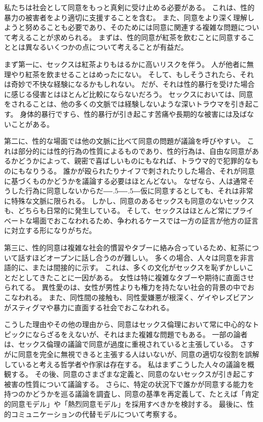 \documentclass[paper=a4,book,openany]{jlreq}
\def\DDASH{―\kern-.5\zw―\kern-.5\zw―}
\begin{document}
私たちは社会として同意をもっと真剣に受け止める必要がある。
これは、性的暴力の被害者をより適切に支援することを含む。
また、同意をより深く理解しようと努めることも必要であり、そのためには同意に関連する複雑な問題について考えることが求められる。
まずは、性的同意が紅茶を飲むことに同意することとは異なるいくつかの点について考えることが有益だ。

まず第一に、セックスは紅茶よりもはるかに高いリスクを伴う。
人が他者に無理やり紅茶を飲ませることはめったにない。
そして、もしそうされたら、それは奇妙で不快な経験になるかもしれない。
だが、それは性的暴行を受けた場合に感じる侵害とはほとんど比較にならないだろう。
セックスにおいては、同意をされることは、他の多くの文脈では経験しないような深いトラウマを引き起こす。
身体的暴行ですら、性的暴行が引き起こす苦痛や長期的な被害には及ばないことがある。

第二に、性的な場面では他の文脈に比べて同意の問題が議論を呼びやすい。
これは部分的には性的行為の性質によるものであり、性的行為は、自由な同意があるかどうかによって、親密で喜ばしいものにもなれば、トラウマ的で犯罪的なものにもなりうる。
誰かが殴られたりナイフで刺されたりした場合、それが同意に基づくものかどうかを議論する必要はほとんどない。
なぜなら、人は通常そうした行為に同意しないからだ{\DDASH}仮に同意するとしても、それは非常に特殊な文脈に限られる。
しかし、同意のあるセックスも同意のないセックスも、どちらも日常的に発生している。
そして、セックスはほとんど常にプライベートな場面でおこなわれるため、争われるケースでは一方の証言が他方の証言に対立する形になりがちだ。

第三に、性的同意は複雑な社会的慣習やタブーに絡み合っているため、紅茶について話すほどオープンに話し合うのが難しい。
多くの場合、人々は同意を非言語的に、または間接的に示す。
これは、多くの文化がセックスを恥ずかしいことだとしてきたことに一因がある。
女性は特に複雑なタブーや期待に直面させられてる。
異性愛のは、女性が男性よりも権力を持たない社会的背景の中でおこなわれる。
また、同性間の接触も、同性愛嫌悪が根深く、ゲイやレズビアンがスティグマや暴力に直面する社会でおこなわれる。

こうした理由やその他の理由から、同意はセックス倫理において常に中心的なトピックにならざるをえないが、それはまた複雑な問題でもある。
一部の論者は、セックス倫理の議論で同意が過度に重視されていると主張している。
さすがに同意を完全に無視できると主張する人はいないが、同意の適切な役割を誤解していると考える哲学者や作家は存在する。
私はまずこうした人々の議論を概観する。
その後、同意のさまざまな定義と、同意のないセックスが引き起こす被害の性質について議論する。
さらに、特定の状況下で誰かが同意する能力を持つのかどうかを巡る議論を調査し、同意の基準を再定義して、たとえば「肯定的同意モデル」や「熱烈同意モデル」を採用すべきかを検討する。
最後に、性的コミュニケーションの代替モデルについて考察する。
\end{document}
